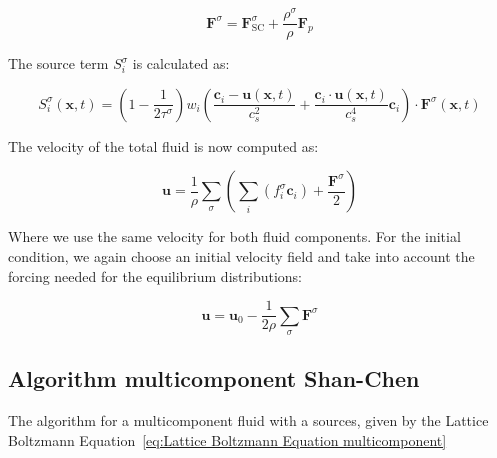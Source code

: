 \begin{equation}\label{eq:Total force Shan-Chen}
    \bm{F}^\sigma = \bm{F}^\sigma_{\text{SC}} + \frac{\rho^\sigma}{\rho}\bm{F}_p
\end{equation}

The source term $S_i^\sigma$ is calculated as:

\begin{equation}\label{eq:Source term multicomponent}
    S_i^\sigma(\bm{x}, t) = \left(1 - \frac{1}{2\tau^\sigma}\right) w_i \left(\frac{\bm{c}_i - \bm{u}(\bm{x}, t)}{c_s^2} + \frac{\bm{c}_i \cdot \bm{u}(\bm{x}, t)}{c_s^4}\bm{c}_i\right) \cdot \bm{F}^\sigma(\bm{x}, t)
\end{equation}

The velocity of the total fluid is now computed as:

\begin{equation}\label{eq:Shan-Chen velocity}
    \bm{u} = \frac{1}{\rho} \sum_\sigma \left(\sum_i \left(f_i^\sigma \bm{c}_i\right) + \frac{\bm{F}^\sigma}{2}\right)
\end{equation}

Where we use the same velocity for both fluid components. For the initial condition, we again choose an initial velocity field and take into account the forcing needed for the equilibrium distributions:

\begin{equation}
    \bm{u} = \bm{u}_0 - \frac{1}{2\rho}\sum_\sigma \bm{F}^\sigma
\end{equation}

\subsection{Algorithm multicomponent Shan-Chen}
The algorithm for a multicomponent fluid with a sources, given by the Lattice Boltzmann Equation~\ref{eq:Lattice Boltzmann Equation multicomponent}

